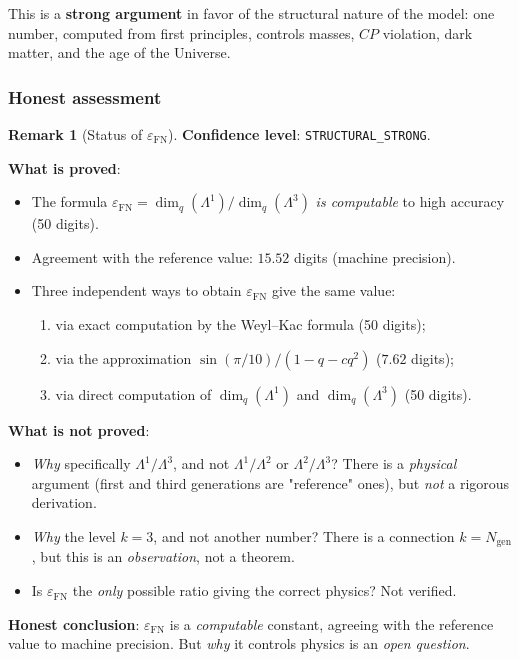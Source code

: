 \documentclass[11pt,a4paper]{article}
\newcommand{\Ngen}{\ensuremath{N_{\text{gen}}}}
\newcommand{\epsFN}{\ensuremath{\varepsilon_{\text{FN}}}}
\theoremstyle{definition}
\newtheorem{remark}[theorem]{Remark}
\begin{document}
This is a \textbf{strong argument} in favor of the structural nature of the model:
one number, computed from first principles, controls
masses, $CP$ violation, dark matter, and the age of the Universe.

\subsubsection{Honest assessment}

\begin{remark}[Status of $\epsFN$]
\label{rem:eps-fn-status}
\textbf{Confidence level}: \texttt{STRUCTURAL\_STRONG}.

\medskip\noindent
\textbf{What is proved}:
\begin{itemize}
    \item The formula $\epsFN = \dim_q(\Lambda^1)/\dim_q(\Lambda^3)$
          \emph{is computable} to high accuracy (50 digits).
    \item Agreement with the reference value: $15.52$ digits (machine precision).
    \item Three independent ways to obtain $\epsFN$ give
          the same value:
          \begin{enumerate}
              \item via exact computation by the Weyl--Kac formula
                    (50 digits);
              \item via the approximation $\sin(\pi/10)/(1-q-cq^2)$
                    ($7.62$ digits);
              \item via direct computation of $\dim_q(\Lambda^1)$
                    and $\dim_q(\Lambda^3)$ (50 digits).
          \end{enumerate}
\end{itemize}

\medskip\noindent
\textbf{What is not proved}:
\begin{itemize}
    \item \emph{Why} specifically $\Lambda^1/\Lambda^3$, and not
          $\Lambda^1/\Lambda^2$ or $\Lambda^2/\Lambda^3$?
          There is a \emph{physical} argument (first and third
          generations are "reference" ones), but \emph{not} a rigorous derivation.
    \item \emph{Why} the level $k = 3$, and not another number?
          There is a connection $k = \Ngen$, but this is
          an \emph{observation}, not a theorem.
    \item Is $\epsFN$ the \emph{only} possible
          ratio giving the correct physics?
          Not verified.
\end{itemize}

\medskip\noindent
\textbf{Honest conclusion}: $\epsFN$ is a \emph{computable}
constant, agreeing with the reference value to machine precision. But
\emph{why} it controls physics is an \emph{open question}.
\end{remark}
\end{document}
